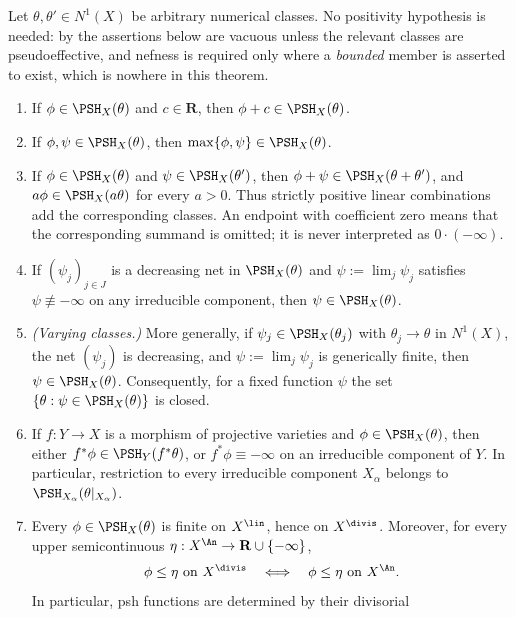 \begin{theorem}
\label{thm:bj-basic-closure}
Let $\theta,\theta'\in N^1(X)$ be arbitrary numerical classes.  No
positivity hypothesis is needed: by  the
assertions below are vacuous unless the relevant classes are
pseudoeffective, and nefness is required only where a \emph{bounded} member
is asserted to exist, which is nowhere in this theorem.
\begin{enumerate}
\item If $\phi\in\PSH_X(\theta)$ and $c\in\mathbf R$, then
      $\phi+c\in\PSH_X(\theta)$.
\item If $\phi,\psi\in\PSH_X(\theta)$, then
      $\max\{\phi,\psi\}\in\PSH_X(\theta)$.
\item If $\phi\in\PSH_X(\theta)$ and
      $\psi\in\PSH_X(\theta')$, then
      $\phi+\psi\in\PSH_X(\theta+\theta')$, and
      $a\phi\in\PSH_X(a\theta)$ for every $a>0$.  Thus strictly
      positive linear combinations add the corresponding classes.  An
      endpoint with coefficient zero means that the corresponding summand
      is omitted; it is never interpreted as $0\cdot(-\infty)$.
\item If $(\psi_j)_{j\in J}$ is a decreasing net in $\PSH_X(\theta)$ and
      $\psi:=\lim_j\psi_j$ satisfies $\psi\not\equiv-\infty$ on any
      irreducible component, then $\psi\in\PSH_X(\theta)$.
\item \emph{(Varying classes.)}  More generally, if $\psi_j\in\PSH_X(\theta_j)$
      with $\theta_j\to\theta$ in $N^1(X)$, the net $(\psi_j)$ is
      decreasing, and $\psi:=\lim_j\psi_j$ is generically finite, then
      $\psi\in\PSH_X(\theta)$.  Consequently, for a fixed function
      $\psi$ the set $\{\theta:\psi\in\PSH_X(\theta)\}$ is closed.
\item If $f:Y\to X$ is a morphism of projective varieties and
      $\phi\in\PSH_X(\theta)$, then either
      $f^*\phi\in\PSH_Y(f^*\theta)$, or $f^*\phi\equiv-\infty$ on an
      irreducible component of $Y$.  In particular, restriction to every
      irreducible component $X_\alpha$ belongs to
      $\PSH_{X_\alpha}(\theta|_{X_\alpha})$.
\item\label{itm:bj-closure:determination} Every $\phi\in\PSH_X(\theta)$ is finite on
      $X^{\lin}$, hence on $X^{\divis}$.  Moreover, for every upper
      semicontinuous $\eta:X^{\An}\to\mathbf R\cup\{-\infty\}$,
      \[
       \phi\leq\eta\ \text{on }X^{\divis}
       \quad\Longleftrightarrow\quad
       \phi\leq\eta\ \text{on }X^{\An}.
      \]
      In particular, psh functions are determined by their divisorial

\end{enumerate}
\end{theorem}
